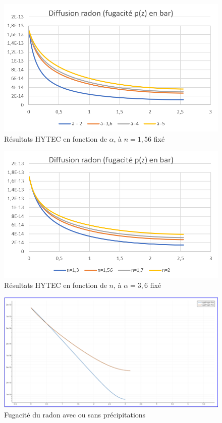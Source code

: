 \documentclass{article}
\begin{document}
\begin{figure}[H]
    \centering
    \includegraphics[height = 0.26 \textheight]{III_C_11.png}
    \caption{Résultats HYTEC en fonction de $\alpha$, à $n=1,56$ fixé}
    \label{fig:sens_hytec_alpha}
\end{figure}
\begin{figure}[H]
    \centering
    \includegraphics[height = 0.26 \textheight]{III_C_12.png}
    \caption{Résultats HYTEC en fonction de $n$, à $\alpha=3,6$ fixé}
    \label{fig:sens_hytec_n}
\end{figure}
\begin{figure}[H]
    \centering
    \includegraphics[height = 0.25 \textheight]{III_C_6.png}
    \caption{Fugacité du radon avec ou sans précipitations}
    \label{fig:rain_fugacity}
\end{figure}
\end{document}
